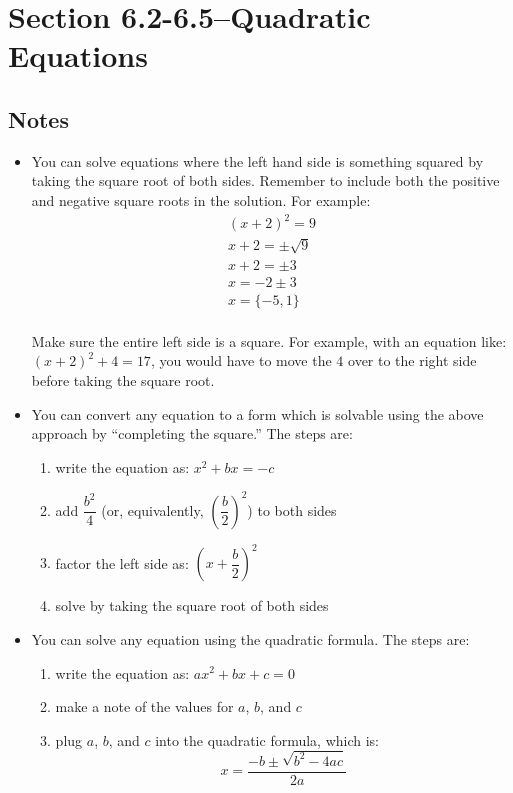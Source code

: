 \documentclass[fleqn,addpoints]{exam}
\begin{document}
\pagebreak

\section{Section 6.2-6.5--Quadratic Equations}

\subsection{Notes}
\begin{itemize}
\item
You can solve equations where the left hand side is something squared by taking the square root of both sides.  Remember
to include both the positive and negative square roots in the solution.  For example:
\begin{align*}
  (x+2)^2 = 9 \\
  x+2 = \pm \sqrt{9} \\
  x+2 = \pm 3 \\
  x = -2 \pm 3 \\
  x = \{-5, 1\} \\
\end{align*}

Make sure the entire left side is a square.  For example, with an equation like: \((x+2)^2  + 4 = 17 \), you would
have to move the $4$ over to the right side before taking the square root.

\item
You can convert any equation to a form which is solvable using the above approach by ``completing the square.''  The steps are:
\begin{enumerate}
\item write the equation as: $x^2 + bx = -c$
\item add $\dfrac{b^2}{4}$ (or, equivalently, $\left( \dfrac{b}{2} \right)^2$) to both sides
\item factor the left side as: $\left(x + \dfrac{b}{2} \right)^2$
\item solve by taking the square root of both sides
\end{enumerate}

\item You can solve any equation using the quadratic formula.  The steps are:
\begin{enumerate}
\item write the equation as: $ax^2 + bx + c = 0$
\item make a note of the values for $a$, $b$, and $c$
\item plug $a$, $b$, and $c$ into the quadratic formula, which is:
\[
  x = \frac{-b \pm \sqrt{b^2 - 4ac}}{2a}
\]
\end{enumerate}


\end{itemize}
\end{document}

